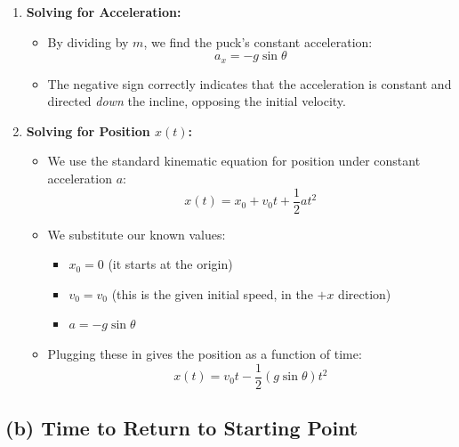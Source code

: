 \documentclass[11pt, a4paper]{article} %
\begin{document}
\begin{enumerate}
\begin{itemize}
        \item \textbf{$x$-direction:} This is the equation of motion along the incline.
        $$\Sigma F_x = -mg \sin\theta = m a_x$$
    \end{itemize}

    \item \textbf{Solving for Acceleration:}
    \begin{itemize}
        \item By dividing by $m$, we find the puck's constant acceleration:
        $$a_x = -g \sin\theta$$
        \item The negative sign correctly indicates that the acceleration is constant and directed \textit{down} the incline, opposing the initial velocity.
    \end{itemize}

    \item \textbf{Solving for Position $x(t)$:}
    \begin{itemize}
        \item We use the standard kinematic equation for position under constant acceleration $a$:
        $$x(t) = x_0 + v_0 t + \frac{1}{2} a t^2$$
        \item We substitute our known values:
        \begin{itemize}
            \item $x_0 = 0$ (it starts at the origin)
            \item $v_0 = v_0$ (this is the given initial speed, in the $+x$ direction)
            \item $a = -g \sin\theta$
        \end{itemize}
        \item Plugging these in gives the position as a function of time:
        $$x(t) = v_0 t - \frac{1}{2} (g \sin\theta) t^2$$
    \end{itemize}
\end{enumerate}

\hrulefill

\subsection*{(b) Time to Return to Starting Point}
\end{document}
